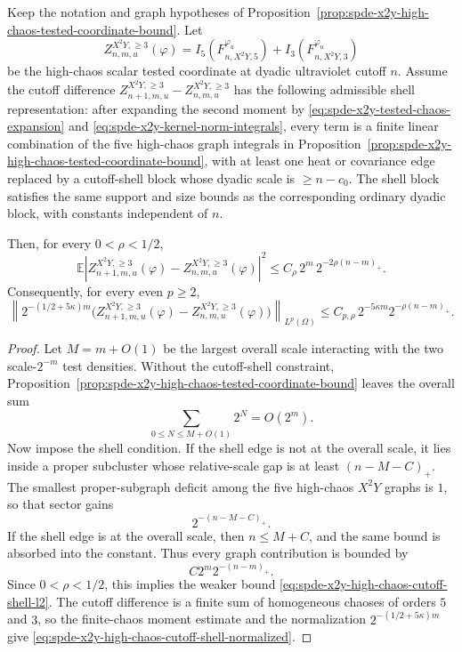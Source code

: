 \begin{proposition}
\label{prop:spde-x2y-high-chaos-tested-coordinate-cutoff-shell-gain}
Keep the notation and graph hypotheses of
Proposition~\ref{prop:spde-x2y-high-chaos-tested-coordinate-bound}.  Let
\[
  Z_{n,m,u}^{X^2Y,\geq3}(\varphi)
  =
  I_5(F_{n,X^2Y,5}^{\varphi_u})
  +
  I_3(F_{n,X^2Y,3}^{\varphi_u})
\]
be the high-chaos scalar tested coordinate at dyadic ultraviolet cutoff
\(n\).  Assume the cutoff difference
\(Z_{n+1,m,u}^{X^2Y,\geq3}-Z_{n,m,u}^{X^2Y,\geq3}\) has the following
admissible shell representation: after expanding the second moment by
\eqref{eq:spde-x2y-tested-chaos-expansion} and
\eqref{eq:spde-x2y-kernel-norm-integrals}, every term is a finite linear
combination of the five high-chaos graph integrals in
Proposition~\ref{prop:spde-x2y-high-chaos-tested-coordinate-bound}, with at
least one heat or covariance edge replaced by a cutoff-shell block whose
dyadic scale is \(\geq n-c_0\).  The shell block satisfies the same support
and size bounds as the corresponding ordinary dyadic block, with constants
independent of \(n\).

Then, for every \(0<\rho<1/2\),
\begin{equation}
  \mathbb E
  \left|
    Z_{n+1,m,u}^{X^2Y,\geq3}(\varphi)
    -
    Z_{n,m,u}^{X^2Y,\geq3}(\varphi)
  \right|^2
  \leq
  C_\rho\,2^m\,2^{-2\rho(n-m)_+}.
  \label{eq:spde-x2y-high-chaos-cutoff-shell-l2}
\end{equation}
Consequently, for every even \(p\geq2\),
\begin{equation}
  \left\|
    2^{-(1/2+5\kappa)m}
    \bigl(
      Z_{n+1,m,u}^{X^2Y,\geq3}(\varphi)
      -
      Z_{n,m,u}^{X^2Y,\geq3}(\varphi)
    \bigr)
  \right\|_{L^p(\Omega)}
  \leq
  C_{p,\rho}\,
  2^{-5\kappa m}2^{-\rho(n-m)_+}.
  \label{eq:spde-x2y-high-chaos-cutoff-shell-normalized}
\end{equation}
\end{proposition}

\begin{proof}
Let \(M=m+O(1)\) be the largest overall scale interacting with the two
scale-\(2^{-m}\) test densities.  Without the cutoff-shell constraint,
Proposition~\ref{prop:spde-x2y-high-chaos-tested-coordinate-bound} leaves
the overall sum
\[
  \sum_{0\leq N\leq M+O(1)}2^N=O(2^m).
\]
Now impose the shell condition.  If the shell edge is not at the overall
scale, it lies inside a proper subcluster whose relative-scale gap is at
least \((n-M-C)_+\).  The smallest proper-subgraph deficit among the five
high-chaos \(X^2Y\) graphs is \(1\), so that sector gains
\[
  2^{-(n-M-C)_+}.
\]
If the shell edge is at the overall scale, then \(n\leq M+C\), and the same
bound is absorbed into the constant.  Thus every graph contribution is
bounded by
\[
  C2^m2^{-(n-m)_+}.
\]
Since \(0<\rho<1/2\), this implies the weaker bound
\eqref{eq:spde-x2y-high-chaos-cutoff-shell-l2}.  The cutoff difference is a
finite sum of homogeneous chaoses of orders \(5\) and \(3\), so the
finite-chaos moment estimate and the normalization
\(2^{-(1/2+5\kappa)m}\) give
\eqref{eq:spde-x2y-high-chaos-cutoff-shell-normalized}.
\end{proof}

